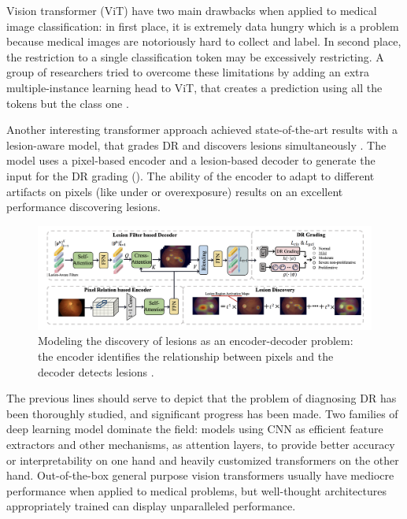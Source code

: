 Vision transformer (ViT) have two main drawbacks when applied to medical image classification: in first place, it is extremely data hungry which is a problem because medical images are notoriously hard to collect and label. In second place, the restriction to a single classification token may be excessively restricting. A group of researchers tried to overcome these limitations by adding an extra multiple-instance learning head to ViT, that creates a prediction using all the tokens but the class one  \cite{suang2021milvt}.

Another interesting transformer approach achieved state-of-the-art results with a lesion-aware model, that grades DR and discovers lesions simultaneously \cite{sun2021lesion-aware}. The model uses a pixel-based encoder and a lesion-based decoder to generate the input for the DR grading (). The ability of the encoder to adapt to different artifacts on pixels (like under or overexposure) results on an excellent performance discovering lesions.

\begin{figure}[tb]
    \centering
    \includegraphics[width=\textwidth]{figures/chapter3/lesion_aware.png}
    \caption{Modeling the discovery of lesions as an encoder-decoder problem: the encoder identifies the relationship between pixels and the decoder detects lesions \cite{sun2021lesion-aware}.}
    \label{fig:lesion_encoder}
\end{figure}

The previous lines should serve to depict that the problem of diagnosing DR has been thoroughly studied, and significant progress has been made. Two families of deep learning model dominate the field: models using CNN as efficient feature extractors and other mechanisms, as attention layers, to provide better accuracy or interpretability on one hand and heavily customized transformers on the other hand. Out-of-the-box general purpose vision transformers usually have mediocre performance when applied to medical problems, but well-thought architectures appropriately trained can display unparalleled performance. 